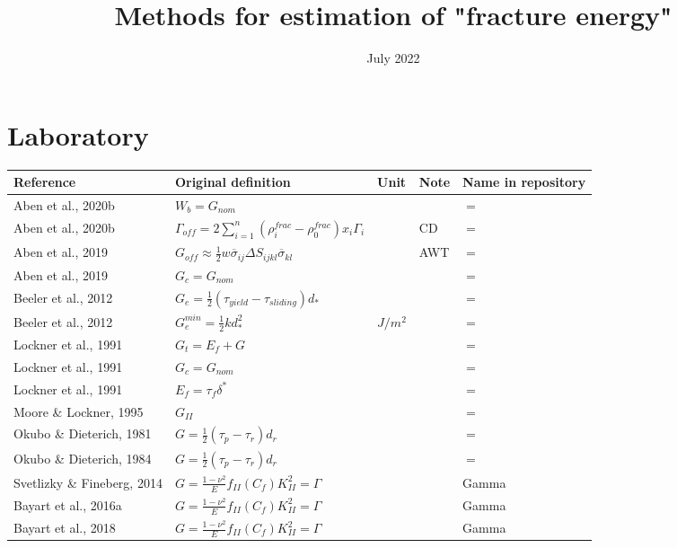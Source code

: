 \documentclass{article}
\title{Methods for estimation of "fracture energy"}
\date{July 2022}
\begin{document}
\maketitle

\section{Laboratory}

\begin{longtable}{|p{4 cm}|p{8 cm}|p{1.25 cm}|p{1.25 cm}|p{1.5 cm}|}
\hline
\textbf{Reference} & \textbf{Original definition} & \textbf{Unit} & \textbf{Note} & \textbf{Name in repository} \\ \hline
Aben et al., 2020b & \(\displaystyle W_b = G_{nom} \) & & & $=$ \\
Aben et al., 2020b & \(\displaystyle \Gamma_{off} = 2 \sum_{i=1}^{n} (\rho_{i}^{frac}-\rho_{0}^{frac}) x_i \Gamma_i \) & & CD & $=$ \\
Aben et al., 2019 & \( \displaystyle G_{off} \approx \frac{1}{2} w \overline{\sigma}_{ij} \Delta S_{ijkl} \overline{\sigma}_{kl} \) & & AWT & $=$ \\
Aben et al., 2019 & \( \displaystyle G_c=G_{nom} \) & & & $=$ \\
Beeler et al., 2012 & \( \displaystyle G_e = \frac{1}{2} (\tau_{yield}-\tau_{sliding}) d_* \) & & & $=$ \\
Beeler et al., 2012 & \( \displaystyle G_e^{min} = \frac{1}{2} k d_*^2 \) & $J/m^2$ & & $=$ \\
Lockner et al., 1991 & \( \displaystyle G_t = E_f + G \) & & & $=$ \\
Lockner et al., 1991 & \( \displaystyle G_c = G_{nom} \)& & & $=$ \\
Lockner et al., 1991 & \( \displaystyle E_f = \tau_f \delta^* \)& & & $=$ \\
Moore \& Lockner, 1995 & \( \displaystyle G_{II} \) & & & $=$ \\
Okubo \& Dieterich, 1981 & \( \displaystyle G = \frac{1}{2} (\tau_p - \tau_r) d_r \) & & & $=$ \\
Okubo \& Dieterich, 1984 & \( \displaystyle G = \frac{1}{2} (\tau_p - \tau_r) d_r \) & & & $=$ \\
Svetlizky \& Fineberg, 2014 & \( \displaystyle G = \frac{1-\nu^2}{E} f_{II}(C_f) K_{II}^2 = \Gamma \) & & & Gamma \\
Bayart et al., 2016a & \( \displaystyle G = \frac{1-\nu^2}{E} f_{II}(C_f) K_{II}^2 = \Gamma \) & & & Gamma \\
Bayart et al., 2018 & \( \displaystyle G = \frac{1-\nu^2}{E} f_{II}(C_f) K_{II}^2 = \Gamma \) & & & Gamma \\

\end{longtable}
\end{document}

